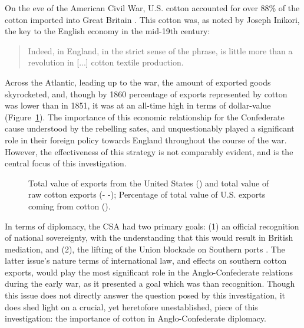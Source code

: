 
\Autocites(Data in Figure~\ref{fig: B.i}:)()[Total exports:][Part 2, Table 2]{u.s.congressImportsduties1884}[Cotton exports:][Table A-III]{northeconomicgrowth1966}
On the eve of the American Civil War, U.S. cotton accounted for over 88\% of the cotton imported into Great Britain \autocite[40]{baileyOtherSide1994}. This
cotton was, as noted by Joseph Inikori, the key to the English economy in the mid-19th century:
\begin{quote}
  Indeed,  in England, in the strict sense of the phrase, is little more than a revolution in [...] cotton textile production.
  \autocite[Joseph Inikori, {The Slave Trade and Revolution in Cotton Textile Production in England}, quoted in][40]{baileyOtherSide1994}
\end{quote}
Across the Atlantic, leading up to the war, the amount of exported goods skyrocketed,
and, though by 1860 percentage of exports represented by cotton was lower than in 1851, it was at an all-time high in
terms of dollar-value (Figure~\ref{fig: B.i}). The importance of this economic relationship for the Confederate cause understood by the rebelling sates,
and unquestionably played a significant role in their foreign policy towards England throughout the course of the war. However, the effectiveness of this strategy
is not comparably evident, and is the central focus of this investigation.

\begin{figure}[ht]
  \centering
  
  \caption{
    Total value of exports from the United States (\textemdash)
    and total value of raw cotton exports (- -);
    Percentage of total value of U.S. exports coming from cotton (\textcolor{red!75!black}{\textemdash}).
  }
  \label{fig: B.i}
\end{figure}

In terms of diplomacy, the CSA had two primary goals: (1) an official recognition of national sovereignty, with the
understanding that this would result in British mediation, and (2), the lifting of the Union blockade on Southern ports
\Autocites()()[][383]{mcphersonBattleCry1988}[W.L. Yancey and A. Dudley Mann $\rightarrow$ Secretary of State R. Toombs, July 15, 1861, in:][45]{davismessagespapers1966}.
The latter issue's nature terms of international law, and effects on southern cotton exports, would play the most significant role in
the Anglo-Confederate relations during the early war, as it presented a goal which was  than
recognition\autocite[John Slidell $\rightarrow$ Secretary of State R.M.T. Hunter, September 26, 1862, in:][187]{davismessagespapers1966}. Though this issue does not
directly answer the question posed by this investigation, it does shed light on a
crucial, yet heretofore unestablished, piece of this investigation: the importance of cotton in Anglo-Confederate diplomacy.

